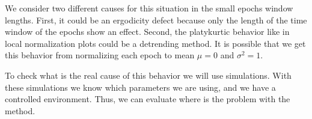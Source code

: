 We consider two different causes for this situation in the small epochs window
lengths. First, it could be an ergodicity defect because only the length of the
time window of the epochs show an effect. Second, the platykurtic behavior like
in local normalization plots \cite{local_normalization} could be a detrending
method. It is possible that we get this behavior from normalizing each epoch to
mean $\mu = 0$ and $\sigma^{2}=1$.

To check what is the real cause of this behavior we will use simulations.
With these simulations we know which parameters we are using, and we have a
controlled environment. Thus, we can evaluate where is the problem with the
method.